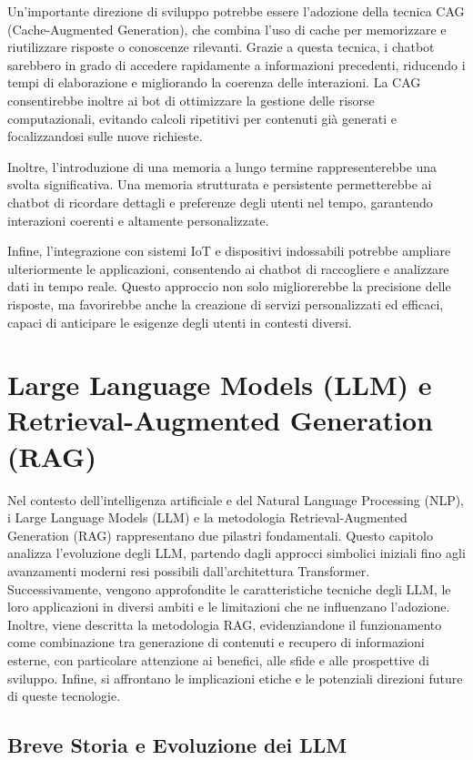 \documentclass[a4paper,twoside,12pt]{toptesi}
\begin{document}
Un'importante direzione di sviluppo potrebbe essere l'adozione della tecnica CAG (Cache-Augmented Generation), che combina l'uso di cache per memorizzare e riutilizzare risposte o conoscenze rilevanti. Grazie a questa tecnica, i chatbot sarebbero in grado di accedere rapidamente a informazioni precedenti, riducendo i tempi di elaborazione e migliorando la coerenza delle interazioni. La CAG consentirebbe inoltre ai bot di ottimizzare la gestione delle risorse computazionali, evitando calcoli ripetitivi per contenuti già generati e focalizzandosi sulle nuove richieste.

Inoltre, l'introduzione di una memoria a lungo termine rappresenterebbe una svolta significativa. Una memoria strutturata e persistente permetterebbe ai chatbot di ricordare dettagli e preferenze degli utenti nel tempo, garantendo interazioni coerenti e altamente personalizzate.

Infine, l'integrazione con sistemi IoT e dispositivi indossabili potrebbe ampliare ulteriormente le applicazioni, consentendo ai chatbot di raccogliere e analizzare dati in tempo reale. Questo approccio non solo migliorerebbe la precisione delle risposte, ma favorirebbe anche la creazione di servizi personalizzati ed efficaci, capaci di anticipare le esigenze degli utenti in contesti diversi.

\chapter{Large Language Models (LLM) e Retrieval-Augmented Generation (RAG)}
Nel contesto dell'intelligenza artificiale e del Natural Language Processing (NLP), i Large Language Models (LLM) e la metodologia Retrieval-Augmented Generation (RAG) rappresentano due pilastri fondamentali. Questo capitolo analizza l'evoluzione degli LLM, partendo dagli approcci simbolici iniziali fino agli avanzamenti moderni resi possibili dall'architettura Transformer. Successivamente, vengono approfondite le caratteristiche tecniche degli LLM, le loro applicazioni in diversi ambiti e le limitazioni che ne influenzano l'adozione. Inoltre, viene descritta la metodologia RAG, evidenziandone il funzionamento come combinazione tra generazione di contenuti e recupero di informazioni esterne, con particolare attenzione ai benefici, alle sfide e alle prospettive di sviluppo. Infine, si affrontano le implicazioni etiche e le potenziali direzioni future di queste tecnologie.

\section{Breve Storia e Evoluzione dei LLM}
\end{document}
